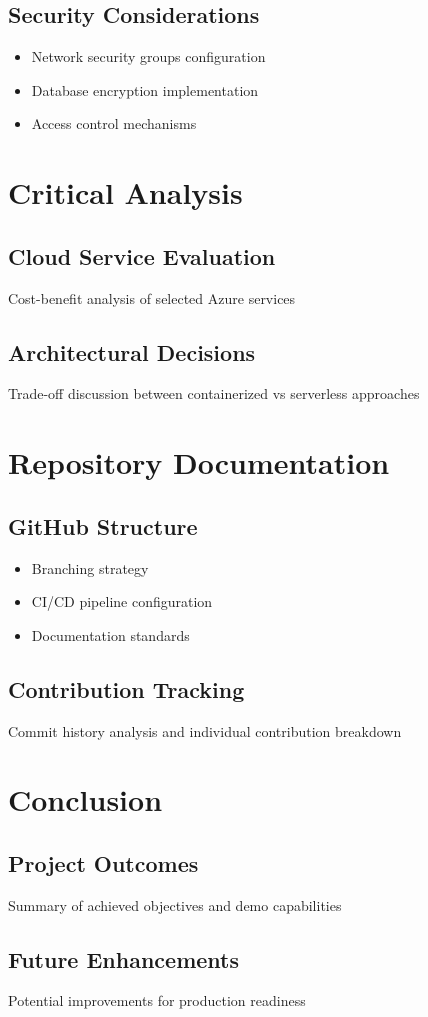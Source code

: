 \documentclass{llncs}
\begin{document}
\subsection{Security Considerations}
\begin{itemize}
    \item Network security groups configuration
    \item Database encryption implementation
    \item Access control mechanisms
\end{itemize}

\section{Critical Analysis}
\subsection{Cloud Service Evaluation}
Cost-benefit analysis of selected Azure services

\subsection{Architectural Decisions}
Trade-off discussion between containerized vs serverless approaches

\section{Repository Documentation}
\subsection{GitHub Structure}
\begin{itemize}
    \item Branching strategy
    \item CI/CD pipeline configuration
    \item Documentation standards
\end{itemize}

\subsection{Contribution Tracking}
Commit history analysis and individual contribution breakdown

\section{Conclusion}
\subsection{Project Outcomes}
Summary of achieved objectives and demo capabilities

\subsection{Future Enhancements}
Potential improvements for production readiness

\begin{thebibliography}{9}

\end{thebibliography}
\end{document}
